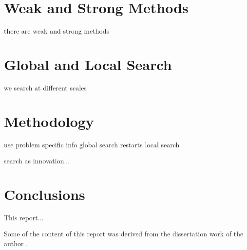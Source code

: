\documentclass[a4paper, 11pt]{article}
\begin{document}
\section{Weak and Strong Methods}
there are weak and strong methods


\section{Global and Local Search}
we search at different scales


\section{Methodology}
use problem specific info
global search
restarts
local search

search as innovation...




\section{Conclusions}
\label{sec:conclusions}
This report...

Some of the content of this report was derived from the dissertation work of the author \cite{Brownlee2008}.



\end{document}
